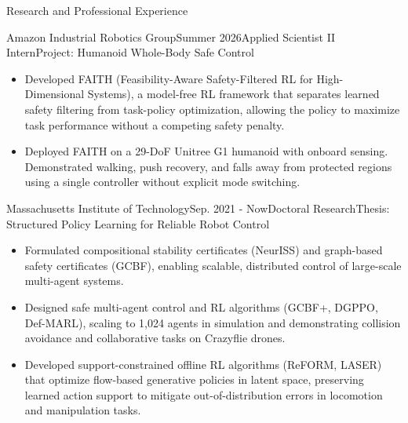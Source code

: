 \documentclass{resume} %
\begin{document}
	\begin{rSection}{Research and Professional Experience}
		\begin{rSubsection2}{Amazon Industrial Robotics Group}{Summer 2026}{Applied Scientist II Intern}{Project: Humanoid Whole-Body Safe Control}
		\end{rSubsection2}
		\begin{itemize}[leftmargin=1.2em,topsep=2pt,itemsep=1pt,parsep=0pt,partopsep=0pt]
			\item Developed FAITH (Feasibility-Aware Safety-Filtered RL for High-Dimensional Systems), a model-free RL framework that separates learned safety filtering from task-policy optimization, allowing the policy to maximize task performance without a competing safety penalty.
			\item Deployed FAITH on a 29-DoF Unitree G1 humanoid with onboard sensing. Demonstrated walking, push recovery, and falls away from protected regions using a single controller without explicit mode switching.
		\end{itemize}

		\begin{rSubsection2}{Massachusetts Institute of Technology}{Sep. 2021 - Now}{Doctoral Research}{Thesis: Structured Policy Learning for Reliable Robot Control}
		\end{rSubsection2}
		\begin{itemize}[leftmargin=1.2em,topsep=2pt,itemsep=1pt,parsep=0pt,partopsep=0pt]
			\item Formulated compositional stability certificates (NeurISS) and graph-based safety certificates (GCBF), enabling scalable, distributed control of large-scale multi-agent systems.
			\item Designed safe multi-agent control and RL algorithms (GCBF+, DGPPO, Def-MARL), scaling to 1,024 agents in simulation and demonstrating collision avoidance and collaborative tasks on Crazyflie drones.
			\item Developed support-constrained offline RL algorithms (ReFORM, LASER) that optimize flow-based generative policies in latent space, preserving learned action support to mitigate out-of-distribution errors in locomotion and manipulation tasks.
		\end{itemize}
	\end{rSection}
\end{document}
